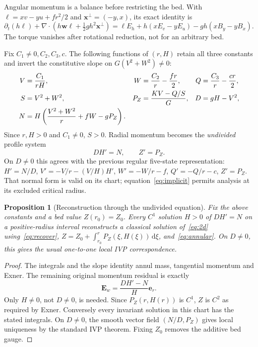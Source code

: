 \documentclass[12pt,a4paper,oneside]{report}
\numberwithin{equation}{chapter}
\newtheorem{proposition}[theorem]{Proposition}
\theoremstyle{remark}\newtheorem{remark}[theorem]{Remark}
\newcommand{\dd}{\,\mathrm d}
\begin{document}
Angular momentum is a balance before restricting the bed. With
$\ell=xv-yu+fr^2/2$ and $\mathbf x^\perp=(-y,x)$, its exact identity is
\begin{equation}\label{eq:torque}
 \partial_t(h\ell)+\nabla\cdot
 (h\mathbf w\ell+\tfrac12gh^2\mathbf x^\perp)
 =\ell E_h+h(xE_v-yE_u)-gh(xB_y-yB_x).
\end{equation}
The torque vanishes after rotational reduction, not for an arbitrary bed.

Fix $C_1\ne0,C_2,C_3,c$. The following functions of $(r,H)$ retain all three
constants and invert the constitutive slope on $G(V^2+W^2)\ne0$:
\begin{align}
 V&=\frac{C_1}{rH},& W&=\frac{C_2}{r}-\frac{fr}{2},&
 Q&=\frac{C_3}{r}-\frac{cr}{2},\label{eq:recover}\\
 S&=V^2+W^2,& P_Z&=\frac{KV-Q/S}{G},& D&=gH-V^2,\notag\\
 N&=H\left(\frac{V^2+W^2}{r}+fW-gP_Z\right).&&&&\label{eq:DN}
\end{align}
Since $r,H>0$ and $C_1\ne0$, $S>0$. Radial momentum becomes the
\emph{undivided} profile system
\begin{equation}\label{eq:implicit}
 \boxed{DH'=N,\qquad Z'=P_Z.}
\end{equation}
On $D\ne0$ this agrees with the previous regular five-state representation:
$H'=N/D$, $V'=-V/r-(V/H)H'$, $W'=-W/r-f$, $Q'=-Q/r-c$, $Z'=P_Z$.
That normal form is valid on its chart; equation~\eqref{eq:implicit} permits
analysis at its excluded critical radius.

\begin{proposition}[Reconstruction through the undivided equation]\label{prop:2d-reconstruction}
Fix the above constants and a bed value $Z(r_0)=Z_0$. Every $C^1$ solution
$H>0$ of $DH'=N$ on a positive-radius interval reconstructs a classical
solution of~\eqref{eq:2d} using~\eqref{eq:recover},
$Z=Z_0+\int_{r_0}^rP_Z(\xi,H(\xi))\dd\xi$, and~\eqref{eq:annular}.
On $D\ne0$, this gives the usual one-to-one local IVP correspondence.
\end{proposition}
\begin{proof}
The integrals and the slope identity annul mass, tangential momentum and
Exner. The remaining original momentum residual is exactly
\begin{equation}\label{eq:cartesian-residual}
 \mathbf E_w=\frac{DH'-N}{H}\mathbf e_r.
\end{equation}
Only $H\ne0$, not $D\ne0$, is needed. Since $P_Z(r,H(r))$ is $C^1$,
$Z$ is $C^2$ as required by Exner. Conversely every invariant solution in
this chart has the stated integrals. On $D\ne0$, the smooth vector field
$(N/D,P_Z)$ gives local uniqueness by the standard IVP theorem. Fixing $Z_0$
removes the additive bed gauge.
\end{proof}
\end{document}
